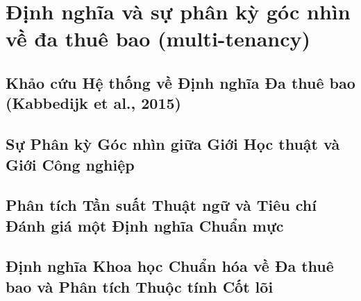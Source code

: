 \par{}
\section{Định nghĩa và sự phân kỳ góc nhìn về đa thuê bao (multi-tenancy)}
\label{outline:1:definitions:1}

\par{}
\subsection{Khảo cứu Hệ thống về Định nghĩa Đa thuê bao (Kabbedijk et al., 2015)}
\label{outline:1:definitions:2}

\par{}
\subsection{Sự Phân kỳ Góc nhìn giữa Giới Học thuật và Giới Công nghiệp}
\label{outline:1:definitions:3}

\par{}
\subsection{Phân tích Tần suất Thuật ngữ và Tiêu chí Đánh giá một Định nghĩa Chuẩn mực}
\label{outline:1:definitions:4}

\par{}
\subsection{Định nghĩa Khoa học Chuẩn hóa về Đa thuê bao và Phân tích Thuộc tính Cốt lõi}
\label{outline:1:definitions:5}
